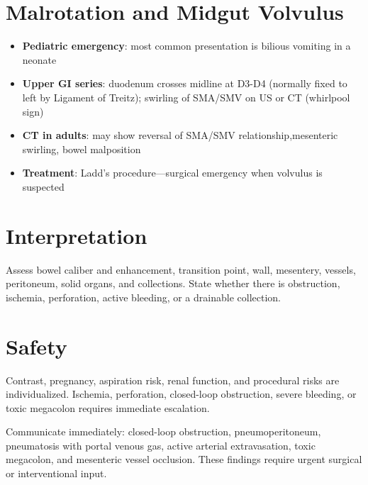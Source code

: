 \section{Malrotation and Midgut Volvulus}
\begin{itemize}
  \item \textbf{Pediatric emergency}: most common presentation is bilious vomiting in a neonate
  \item \textbf{Upper GI series}: duodenum crosses midline at D3-D4 (normally fixed to left by Ligament of Treitz); swirling of SMA/SMV on US or CT (whirlpool sign)
  \item \textbf{CT in adults}: may show reversal of SMA/SMV relationship,mesenteric swirling, bowel malposition
  \item \textbf{Treatment}: Ladd's procedure---surgical emergency when volvulus is suspected
\end{itemize}

\section{Interpretation}
Assess bowel caliber and enhancement, transition point, wall, mesentery, vessels, peritoneum, solid organs, and collections. State whether there is obstruction, ischemia, perforation, active bleeding, or a drainable collection.

\section{Safety}
Contrast, pregnancy, aspiration risk, renal function, and procedural risks are individualized. Ischemia, perforation, closed-loop obstruction, severe bleeding, or toxic megacolon requires immediate escalation.

\begin{pearlbox}
Communicate immediately: closed-loop obstruction, pneumoperitoneum, pneumatosis with portal venous gas, active arterial extravasation, toxic megacolon, and mesenteric vessel occlusion. These findings require urgent surgical or interventional input.
\end{pearlbox}

\clearpage
